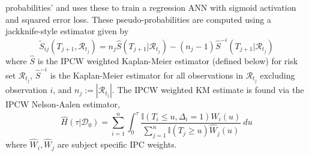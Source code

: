 \documentclass[
  letterpaper,
]{scrbook}
\theoremstyle{plain}
\theoremstyle{definition}
\theoremstyle{remark}
\begin{document}
probabilities' and uses these to train a regression ANN with sigmoid
activation and squared error loss. These pseudo-probabilities are
computed using a jackknife-style estimator given by \[
\tilde{S}_{ij}(T_{j+1}, \mathcal{R}_{t_j}) = n_j\hat{S}(T_{j+1}|\mathcal{R}_{t_j}) - (n_j - 1)\hat{S}^{-i}(T_{j+1}|\mathcal{R}_{t_j})
\] where \(\hat{S}\) is the IPCW weighted Kaplan-Meier estimator
(defined below) for risk set \(\mathcal{R}_{t_j}\), \(\hat{S}^{-i}\) is
the Kaplan-Meier estimator for all observations in \(\mathcal{R}_{t_j}\)
excluding observation \(i\), and \(n_j := |\mathcal{R}_{t_j}|\). The
IPCW weighted KM estimate is found via the IPCW Nelson-Aalen estimator,
\[
\hat{H}(\tau|\mathcal{D}_0) = \sum^n_{i=1} \int^\tau_0 \frac{\mathbb{I}(T_i \leq u, \Delta_i = 1)\hat{W}_i(u)}{\sum^n_{j=1} \mathbb{I}(T_j \geq u) \hat{W}_j(u)} \ du
\] where \(\hat{W}_i,\hat{W}_j\) are subject specific IPC weights.
\end{document}

